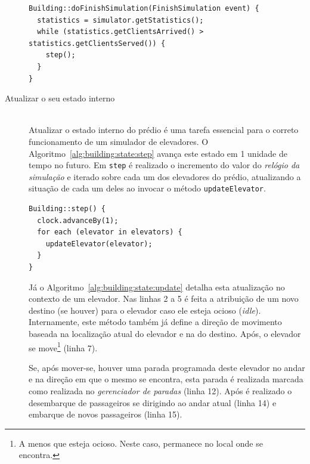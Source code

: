 \begin{description}
    \begin{algorithm}[htb!]
      \centering
        \begin{verbatim}
Building::doFinishSimulation(FinishSimulation event) {
  statistics = simulator.getStatistics();
  while (statistics.getClientsArrived() > statistics.getClientsServed()) {
    step();
  }
}
        \end{verbatim}
      \caption{\textit{Prédio} reagindo ao \textit{fim da simulação}.}
      \label{alg:building:finish}
    \end{algorithm}

  \item[Atualizar o seu estado interno] \hfill \\

    Atualizar o estado interno do prédio é uma tarefa essencial para o correto
    funcionamento de um simulador de elevadores. O
    Algoritmo~\ref{alg:building:state:step} avança este estado em 1 unidade de
    tempo no futuro. Em \texttt{step} é realizado o incremento do valor do
    \textit{relógio da simulação} e iterado sobre cada um dos elevadores do
    prédio, atualizando a situação de cada um deles ao invocar o método
    \texttt{updateElevator}.

    \begin{algorithm}[htb!]
      \centering
        \begin{verbatim}
Building::step() {
  clock.advanceBy(1);
  for each (elevator in elevators) {
    updateElevator(elevator);
  }
}
        \end{verbatim}
      \caption{\textit{Prédio} atualizando seu \textit{estado interno} em 1 \textit{unidade de tempo}.}
      \label{alg:building:state:step}
    \end{algorithm}

    Já o Algoritmo~\ref{alg:building:state:update} detalha esta atualização no
    contexto de um elevador. Nas linhas 2 a 5 é feita a atribuição de um novo
    destino (se houver) para o elevador caso ele esteja ocioso (\textit{idle}).
    Internamente, este método também já define a direção de movimento baseada na
    localização atual do elevador e na do destino. Após, o elevador se
    move\footnote{A menos que esteja ocioso. Neste caso, permanece no local onde
    se encontra.} (linha 7).

    Se, após mover-se, houver uma parada programada deste elevador no andar e na
    direção em que o mesmo se encontra, esta parada é realizada marcada como
    realizada no \textit{gerenciador de paradas} (linha 12). Após é realizado o
    desembarque de passageiros se dirigindo ao andar atual (linha 14) e embarque
    de novos passageiros (linha 15).


\end{description}
